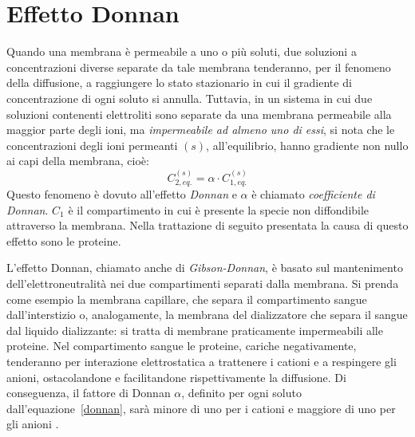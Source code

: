 \section{Effetto Donnan}\label{sec:donnan}
Quando una membrana è permeabile a uno o più soluti, due soluzioni a concentrazioni diverse separate da tale membrana tenderanno, per il fenomeno della diffusione, a raggiungere lo stato stazionario in cui il gradiente di concentrazione di ogni soluto si annulla. Tuttavia, in un sistema in cui due soluzioni contenenti elettroliti sono separate da una membrana permeabile alla maggior parte degli ioni, ma \textit{impermeabile ad almeno uno di essi}, si nota che le concentrazioni degli ioni permeanti $(s)$, all'equilibrio, hanno gradiente non nullo ai capi della membrana, cioè:
\begin{equation}\label{donnan}
	C_{2,eq.}^{(s)} = \alpha \cdot C_{1,eq.}^{(s)}
\end{equation}
\noindent
\newline
Questo fenomeno è dovuto all'effetto \textit{Donnan} \cite{articolo_donnan} e $\alpha$ è chiamato \textit{coefficiente di Donnan}. $C_1$ è il compartimento in cui è presente la specie non diffondibile attraverso la membrana. Nella trattazione di seguito presentata la causa di questo effetto sono le proteine.

L'effetto Donnan, chiamato anche di \textit{Gibson-Donnan}, è basato sul mantenimento dell'elettroneutralità nei due compartimenti separati dalla membrana. Si prenda come esempio la membrana capillare, che separa il compartimento sangue dall'interstizio o, analogamente, la membrana del dializzatore che separa il sangue dal liquido dializzante: si tratta di membrane praticamente impermeabili alle proteine. Nel compartimento sangue le proteine, cariche negativamente, tenderanno per interazione elettrostatica a trattenere i cationi e a respingere gli anioni, ostacolandone e facilitandone rispettivamente la diffusione. Di conseguenza, il fattore di Donnan $\alpha$, definito per ogni soluto dall'equazione~\ref{donnan}, sarà minore di uno per i cationi e maggiore di uno per gli anioni \cite{ursino}.

